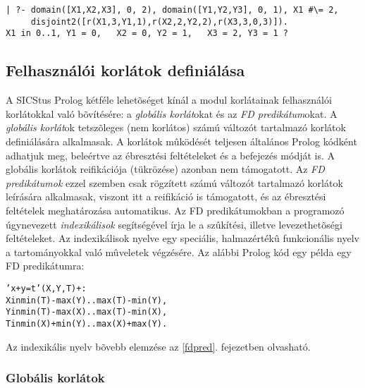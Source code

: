 \begin{verbatim}
| ?- domain([X1,X2,X3], 0, 2), domain([Y1,Y2,Y3], 0, 1), X1 #\= 2,
     disjoint2([r(X1,3,Y1,1),r(X2,2,Y2,2),r(X3,3,0,3)]).
X1 in 0..1, Y1 = 0,   X2 = 0, Y2 = 1,   X3 = 2, Y3 = 1 ?
\end{verbatim}

\subsection{Felhasználói korlátok definiálása}

A SICStus Prolog kétféle lehetõséget kínál a \clpfd modul korlátainak
felhasználói korlátokkal való bõvítésére: a \emph{globális korlát}okat és
az \emph{FD predikátum}okat. A \emph{globális korlát}ok tetszõleges (nem korlátos)
számú változót tartalmazó korlátok definiálására alkalmasak. A korlátok
mûködését teljesen általános Prolog kódként adhatjuk meg, beleértve az
ébresztési feltételeket és a befejezés módját is. A globális korlátok
reifikációja (tükrözése) azonban nem támogatott. Az \emph{FD predikátumok}
ezzel szemben csak rögzített számú változót tartalmazó korlátok leírására
alkalmasak, viszont itt a reifikáció is támogatott, és az ébresztési
feltételek meghatározása automatikus. Az FD predikátumokban a programozó
úgynevezett \emph{indexikálisok} segítségével írja le a szûkítési, illetve
levezethetõségi feltételeket. Az indexikálisok nyelve egy speciális, halmazértékû
funkcionális nyelv a tartományokkal való mûveletek végzésére. Az alábbi
Prolog kód egy példa egy FD predikátumra:

\begin{alltt}
% Az X+Y #= T korlát (intervallum szûkítéssel)
'x+y=t'(X,Y,T) +:  
        X in min(T) - max(Y)..max(T) - min(Y),
        Y in min(T) - max(X)..max(T) - min(X),
        T in min(X) + min(Y)..max(X) + max(Y).
\end{alltt}

Az indexikális nyelv bõvebb elemzése az \ref{fdpred}. fejezetben olvasható.

\subsubsection{Globális korlátok}

\label{globalis}

